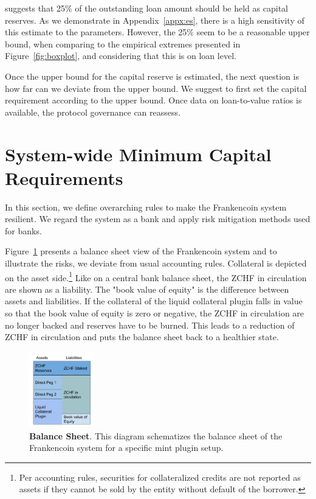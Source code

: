 \documentclass[english,11pt]{article}
\begin{document}
suggests that 25\% of the outstanding loan amount should be held as capital reserves.
As we demonstrate in Appendix~\ref{appx:es}, there is a high sensitivity of this estimate
to the parameters. However, the 25\% seem to be a reasonable upper bound, when
comparing to the empirical extremes presented in Figure~\ref{fig:boxplot}, and
considering that this is on loan level.

Once the upper bound for the capital reserve is estimated, the next question is how far can 
we deviate from the upper bound. We suggest to first set the capital requirement according
to the upper bound. Once data on loan-to-value ratios is available, the protocol governance can
reassess.


\section{System-wide Minimum Capital Requirements}
In this section, we define overarching rules to make the Frankencoin system
resilient. We regard the system as a bank and apply risk mitigation methods
used for banks.

Figure~\ref{fig:bs} presents a balance sheet view of the Frankencoin system
and to illustrate the risks, we deviate from usual accounting rules.
Collateral is depicted on the asset side.\footnote{Per accounting rules, 
securities for collateralized credits are not reported as assets
if they cannot be sold by the entity without default of the borrower.}
Like on a central bank balance sheet, the ZCHF in circulation are shown
as a liability. The "book value of equity" is the difference between assets
and liabilities. If the collateral of the liquid collateral plugin falls in value so that
the book value of equity is zero or negative, the ZCHF in circulation
are no longer backed and reserves have to be burned. This leads
to a reduction of ZCHF in circulation and puts the balance sheet back to
a healthier state.

\begin{figure}[h]
    \center
    \includegraphics[width=0.25\textwidth]{FCBalanceSheet.pdf}
    \caption{\textbf{Balance Sheet}. This diagram
    schematizes the balance sheet of the Frankencoin system for
    a specific mint plugin setup.}\label{fig:bs}
\end{figure}
\end{document}
